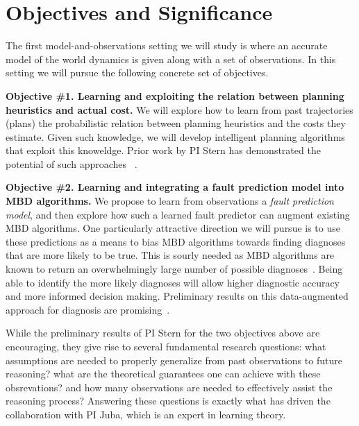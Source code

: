 \documentclass[12pt]{article}
\begin{document}
\section{Objectives and Significance}

The first model-and-observations setting we will study is where an accurate model of the world dynamics is given along with a set of observations. In this setting we will pursue the following concrete set of objectives. 

{\bf Objective \#1. Learning and exploiting the relation between planning heuristics and actual cost.} 
We will explore how to learn from past trajectories (plans) the probabilistic relation between planning heuristics and the costs they estimate. Given such knowledge, we will develop intelligent planning algorithms that exploit this knoweldge. Prior work by PI Stern has demonstrated the potential of such approaches~
\cite{stern2011probably,stern2012exploring,stern2014potential}. %

{\bf Objective \#2. Learning and integrating a fault prediction model into MBD algorithms.} 
We propose to learn from observations a {\em fault prediction model}, and then explore how such a learned fault predictor can augment existing MBD algorithms. 
One particularly attractive direction we will pursue is to use these predictions as a means to bias MBD algorithms towards finding diagnoses that are more likely to be true. This is sourly needed as MBD algorithms are known to return an overwhelmingly large number of possible diagnoses~\cite{stern2015many}. Being able to identify the more likely diagnoses will allow higher diagnostic accuracy and more informed decision making. Preliminary results on this data-augmented approach for diagnosis are promising~\cite{elmishali2016dataAugmented}. 



While the preliminary results of PI Stern for the two objectives above are encouraging, they give rise to several fundamental research questions: what assumptions are needed to properly generalize from past observations to future reasoning? what are the theoretical guarantees one can achieve with these obsrevations? and how many observations are needed to effectively assist the reasoning process? Answering these questions is exactly what has driven the collaboration with PI Juba, which is an expert in learning theory. 
\end{document}
